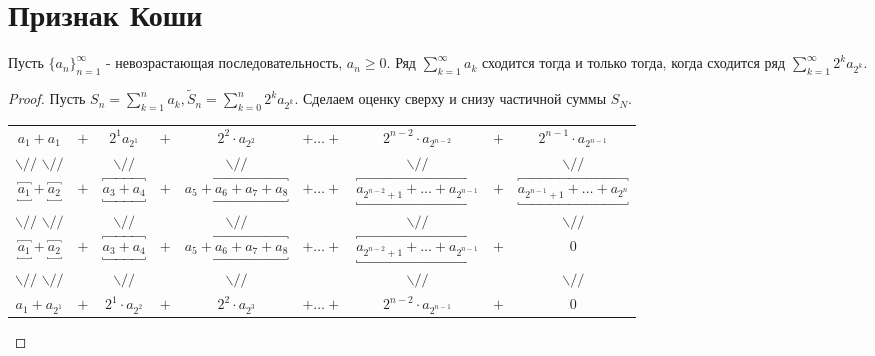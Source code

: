 	\section{Признак Коши}
	
	\begin{theorem}
		Пусть $\{a_n\}^{\infty}_{n = 1}$ - невозрастающая последовательность, $a_n \geqslant 0.$ Ряд $\sum^{\infty}_{k = 1} a_k$ сходится тогда и только тогда, когда сходится ряд $\sum^{\infty}_{k = 1} 2^k a_{2^k}.$
	\end{theorem}
	
	\begin{proof}
		Пусть $S_n = \sum^n_{k = 1} a_k, \tilde{S}_n = \sum^n_{k = 0} 2^k a_{2^k}$. Сделаем оценку сверху и снизу частичной суммы $S_N$.
		
		{\small
		\begin{tabular}{ccccccccc}
			$a_1 + a_1$ & $+$ & $2^1 a_{2^1}$ & $+$ & $2^2 \cdot a_{2^2}$ & $+ \dots +$ & $2^{n - 2} \cdot a_{2^{n - 2}}$ & $+$ & $2^{n - 1} \cdot a_{2^{n - 1}}$ \\
			$\backslash //$ $\backslash //$ & & $\backslash //$ & & $\backslash //$ & & $\backslash //$ & & $\backslash //$ \\
			$\overbracket{\underbracket{a_1}} + \overbracket{\underbracket{a_2}}$ & $+$ & $\overbracket{\underbracket{a_3 + a_4}}$ & $+$ & $\overbracket{\underbracket{a_5 + a_6 + a_7 + a_8}}$ & $+ \dots +$ & $\overbracket{\underbracket{a_{2^{n - 2} + 1} + \dots + a_{2^{n - 1}}}}$ & $+$ & $\overbracket{\underbracket{a_{2^{n - 1} + 1} + \dots + a_{2^n}}}$ \\
			$\backslash //$ $\backslash //$ & & $\backslash //$ & & $\backslash //$ & & $\backslash //$ & & $\backslash //$ \\
			$\overbracket{\underbracket{a_1}} + \overbracket{\underbracket{a_2}}$ & $+$ & $\overbracket{\underbracket{a_3 + a_4}}$ & $+$ & $\overbracket{\underbracket{a_5 + a_6 + a_7 + a_8}}$ & $+ \dots +$ & $\overbracket{\underbracket{a_{2^{n - 2} + 1} + \dots + a_{2^{n - 1}}}}$ & $+$ & $0$ \\
			$\backslash //$ $\backslash //$ & & $\backslash //$ & & $\backslash //$ & & $\backslash //$ & & $\backslash //$ \\
			$a_1 + a_{2^1}$ & $+$ & $2^1 \cdot a_{2^2}$ & $+$ & $2^2 \cdot a_{2^3}$ & $+ \dots +$ & $2^{n - 2} \cdot a_{2^{n - 1}}$ & $+$ & $0$ \\
		\end{tabular}
	    }
	    

\end{proof}
